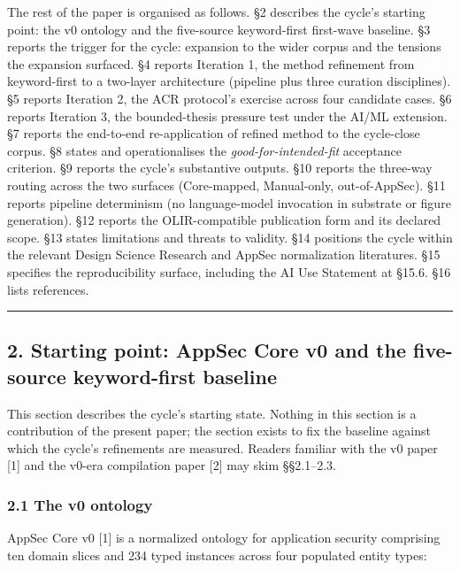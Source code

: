 \documentclass[
]{article}
\begin{document}
The rest of the paper is organised as follows. §2 describes the cycle's
starting point: the v0 ontology and the five-source keyword-first
first-wave baseline. §3 reports the trigger for the cycle: expansion to
the wider corpus and the tensions the expansion surfaced. §4 reports
Iteration 1, the method refinement from keyword-first to a two-layer
architecture (pipeline plus three curation disciplines). §5 reports
Iteration 2, the ACR protocol's exercise across four candidate cases. §6
reports Iteration 3, the bounded-thesis pressure test under the AI/ML
extension. §7 reports the end-to-end re-application of refined method to
the cycle-close corpus. §8 states and operationalises the
\emph{good-for-intended-fit} acceptance criterion. §9 reports the
cycle's substantive outputs. §10 reports the three-way routing across
the two surfaces (Core-mapped, Manual-only, out-of-AppSec). §11 reports
pipeline determinism (no language-model invocation in substrate or
figure generation). §12 reports the OLIR-compatible publication form and
its declared scope. §13 states limitations and threats to validity. §14
positions the cycle within the relevant Design Science Research and
AppSec normalization literatures. §15 specifies the reproducibility
surface, including the AI Use Statement at §15.6. §16 lists references.

\begin{center}\rule{0.5\linewidth}{0.5pt}\end{center}

\subsection{2. Starting point: AppSec Core v0 and the five-source
keyword-first
baseline}\label{starting-point-appsec-core-v0-and-the-five-source-keyword-first-baseline}

This section describes the cycle's starting state. Nothing in this
section is a contribution of the present paper; the section exists to
fix the baseline against which the cycle's refinements are measured.
Readers familiar with the v0 paper {[}1{]} and the v0-era compilation
paper {[}2{]} may skim §§2.1--2.3.

\subsubsection{2.1 The v0 ontology}\label{the-v0-ontology}

AppSec Core v0 {[}1{]} is a normalized ontology for application security
comprising ten domain slices and 234 typed instances across four
populated entity types:
\end{document}
